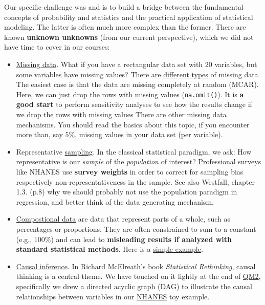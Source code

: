 \documentclass[
]{article}
\begin{document}
Our specific challenge was and is to build a bridge between the
fundamental concepts of probability and statistics and the practical
application of statistical modeling. The latter is often much more
complex than the former. There are known \textbf{unknown unknowns} (from
our current perspective), which we did not have time to cover in our
courses:

\begin{itemize}
\item
  \href{https://en.wikipedia.org/wiki/Missing_data}{Missing data}. What
  if you have a rectangular data set with 20 variables, but some
  variables have missing values? There are
  \href{https://en.wikipedia.org/wiki/Missing_data\#Types}{different
  types} of missing data. The easiest case is that the data are missing
  completely at random (MCAR). Here, we can just drop the rows with
  missing values (\texttt{na.omit()}). It is \textbf{a good start} to
  perform sensitivity analyses to see how the results change if we drop
  the rows with missing values There are other missing data mechanisms.
  You should read the basics about this topic, if you encounter more
  than, say \(5\%\), missing values in your data set (per variable).
\item
  Representative
  \href{https://en.wikipedia.org/wiki/Sampling_(statistics)}{sampling}.
  In the classical statistical paradigm, we ask: How representative is
  our \emph{sample} of the \emph{population} of interest? Professional
  surveys like NHANES use \textbf{survey weights} in order to correct
  for sampling bias respectively non-representativeness in the sample.
  See also Westfall, chapter 1.3. (p.8) why we should probably not use
  the population paradigm in regression, and better think of the data
  generating mechanism.
\item
  \href{https://en.wikipedia.org/wiki/Compositional_data}{Compostional
  data} are data that represent parts of a whole, such as percentages or
  proportions. They are often constrained to sum to a constant (e.g.,
  \(100\%\)) and can lead to \textbf{misleading results if analyzed with
  standard statistical methods}. Here is a
  \href{https://www.geo.fu-berlin.de/en/v/soga-r/Advances-statistics/Feature-scales/Intro_compositional_data/index.html}{simple
  example}.
\item
  \href{https://projecteuclid.org/journals/statistics-surveys/volume-3/issue-none/Causal-inference-in-statistics-An-overview/10.1214/09-SS057.full}{Causal
  inference}. In Richard McElreath's book \emph{Statistical Rethinking},
  causal thinking is a central theme. We have touched on it lightly at
  the end of
  \href{https://jdegenfellner.github.io/Script_QM2_ZHAW/multiple-linear-regression.html\#more-than-2-predictors}{QM2},
  specifically we drew a directed acyclic graph (DAG) to illustrate the
  causal relationships between variables in our
  \href{https://jdegenfellner.github.io/Script_QM2_ZHAW/multiple-linear-regression.html\#example_nhanes}{NHANES}
  toy example.
\end{itemize}
\end{document}
